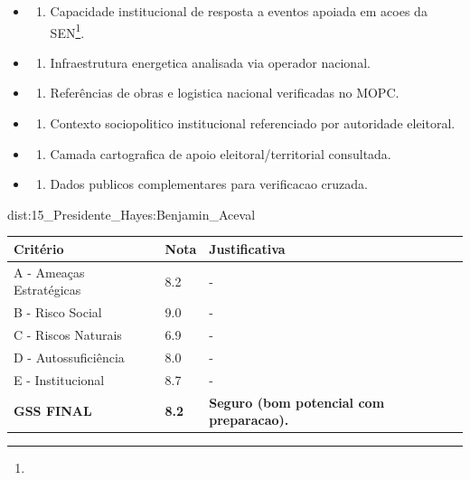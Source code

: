 {\begin{itemize}
\begin{enumerate}
  \end{enumerate}
\item
  \begin{enumerate}
  \def\labelenumi{\arabic{enumi})}
  \setcounter{enumi}{6}
  \tightlist
  \item
    Capacidade institucional de resposta a eventos apoiada em acoes da
    SEN\footnote{\fineSEN}.
  \end{enumerate}
\item
  \begin{enumerate}
  \def\labelenumi{\arabic{enumi})}
  \setcounter{enumi}{7}
  \tightlist
  \item
    Infraestrutura energetica analisada via operador nacional.
  \end{enumerate}
\item
  \begin{enumerate}
  \def\labelenumi{\arabic{enumi})}
  \setcounter{enumi}{8}
  \tightlist
  \item
    Referências de obras e logistica nacional verificadas no MOPC.
  \end{enumerate}
\item
  \begin{enumerate}
  \def\labelenumi{\arabic{enumi})}
  \setcounter{enumi}{9}
  \tightlist
  \item
    Contexto sociopolitico institucional referenciado por autoridade
    eleitoral.
  \end{enumerate}
\item
  \begin{enumerate}
  \def\labelenumi{\arabic{enumi})}
  \setcounter{enumi}{10}
  \tightlist
  \item
    Camada cartografica de apoio eleitoral/\allowbreak territorial consultada.
  \end{enumerate}
\item
  \begin{enumerate}
  \def\labelenumi{\arabic{enumi})}
  \setcounter{enumi}{11}
  \tightlist
  \item
    Dados publicos complementares para verificacao cruzada.
  \end{enumerate}
\end{itemize}}{dist:15_Presidente_Hayes:Benjamin_Aceval}
\begin{table}[ht!]
\small \begin{tabular}{p{3.0cm}p{0.8cm}p{6.0cm}} \toprule
\textbf{Critério} & \textbf{Nota} & \textbf{Justificativa} \\ \midrule
A - Ameaças Estratégicas & 8.2 & - \\
B - Risco Social & 9.0 & - \\
C - Riscos Naturais & 6.9 & - \\
D - Autossuficiência & 8.0 & - \\
E - Institucional & 8.7 & - \\
\midrule \textbf{GSS FINAL} & \textbf{8.2} & \textbf{Seguro (bom potencial com preparacao).} \\ \bottomrule \end{tabular}
\end{table}

